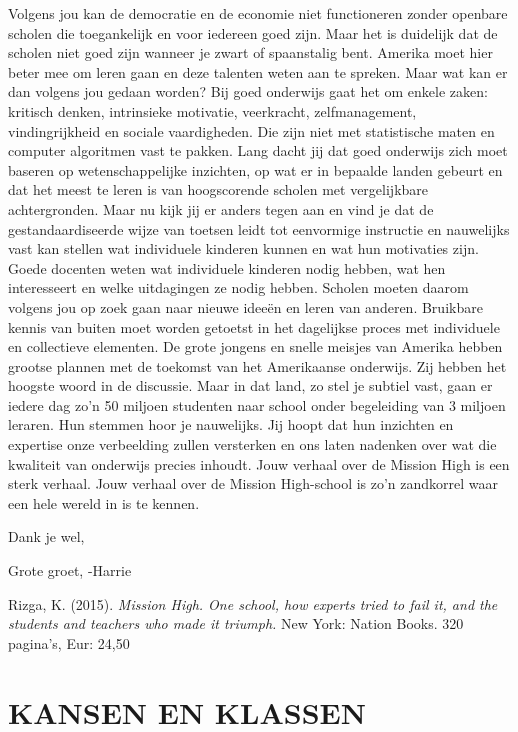 \documentclass[]{book}
\begin{document}
Volgens jou kan de democratie en de economie niet functioneren zonder
openbare scholen die toegankelijk en voor iedereen goed zijn. Maar het
is duidelijk dat de scholen niet goed zijn wanneer je zwart of
spaanstalig bent. Amerika moet hier beter mee om leren gaan en deze
talenten weten aan te spreken. Maar wat kan er dan volgens jou gedaan
worden? Bij goed onderwijs gaat het om enkele zaken: kritisch denken,
intrinsieke motivatie, veerkracht, zelfmanagement, vindingrijkheid en
sociale vaardigheden. Die zijn niet met statistische maten en computer
algoritmen vast te pakken. Lang dacht jij dat goed onderwijs zich moet
baseren op wetenschappelijke inzichten, op wat er in bepaalde landen
gebeurt en dat het meest te leren is van hoogscorende scholen met
vergelijkbare achtergronden. Maar nu kijk jij er anders tegen aan en
vind je dat de gestandaardiseerde wijze van toetsen leidt tot eenvormige
instructie en nauwelijks vast kan stellen wat individuele kinderen
kunnen en wat hun motivaties zijn. Goede docenten weten wat individuele
kinderen nodig hebben, wat hen interesseert en welke uitdagingen ze
nodig hebben. Scholen moeten daarom volgens jou op zoek gaan naar nieuwe
ideeën en leren van anderen. Bruikbare kennis van buiten moet worden
getoetst in het dagelijkse proces met individuele en collectieve
elementen. De grote jongens en snelle meisjes van Amerika hebben grootse
plannen met de toekomst van het Amerikaanse onderwijs. Zij hebben het
hoogste woord in de discussie. Maar in dat land, zo stel je subtiel
vast, gaan er iedere dag zo'n 50 miljoen studenten naar school onder
begeleiding van 3 miljoen leraren. Hun stemmen hoor je nauwelijks. Jij
hoopt dat hun inzichten en expertise onze verbeelding zullen versterken
en ons laten nadenken over wat die kwaliteit van onderwijs precies
inhoudt. Jouw verhaal over de Mission High is een sterk verhaal. Jouw
verhaal over de Mission High-school is zo'n zandkorrel waar een hele
wereld in is te kennen.

Dank je wel,

Grote groet, -Harrie

Rizga, K. (2015). \emph{Mission High. One school, how experts tried to
fail it, and the students and teachers who made it triumph.} New York:
Nation Books. 320 pagina's, Eur: 24,50

\hypertarget{kansen-en-klassen}{%
\chapter*{KANSEN EN KLASSEN}\label{kansen-en-klassen}}
\end{document}
